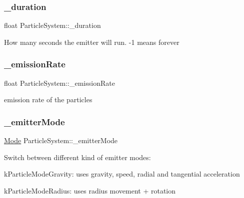 \subsubsection{\texorpdfstring{\+\_\+duration}{\_duration}}
{\footnotesize\ttfamily float Particle\+System\+::\+\_\+duration\hspace{0.3cm}{\ttfamily [protected]}}

How many seconds the emitter will run. -\/1 means \textquotesingle{}forever\textquotesingle{} \mbox{\label{classParticleSystem_a5fa735aab022d3f12b2b693e7de1d450}} 
\subsubsection{\texorpdfstring{\+\_\+emission\+Rate}{\_emissionRate}}
{\footnotesize\ttfamily float Particle\+System\+::\+\_\+emission\+Rate\hspace{0.3cm}{\ttfamily [protected]}}

emission rate of the particles \mbox{\label{classParticleSystem_a9ff65b9b90906d0c8fd7ae6dd9af9b00}} 
\subsubsection{\texorpdfstring{\+\_\+emitter\+Mode}{\_emitterMode}}
{\footnotesize\ttfamily \hyperlink{classParticleSystem_aa380bd1c6062c44d56268a61ade9c8fb}{Mode} Particle\+System\+::\+\_\+emitter\+Mode\hspace{0.3cm}{\ttfamily [protected]}}

Switch between different kind of emitter modes\+:
\begin{DoxyItemize}
\item k\+Particle\+Mode\+Gravity\+: uses gravity, speed, radial and tangential acceleration
\item k\+Particle\+Mode\+Radius\+: uses radius movement + rotation 
\end{DoxyItemize}\mbox{\label{classParticleSystem_a97debaff22581dba62b7c109fe34e09c}} 
